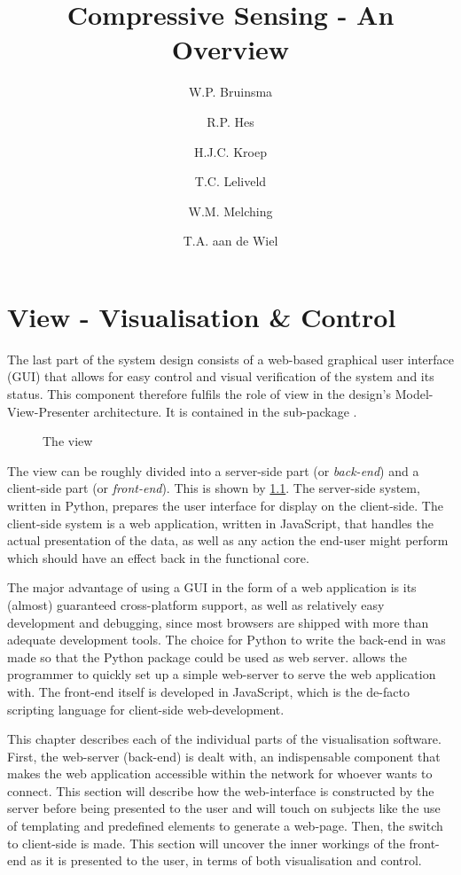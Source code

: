 \documentclass[a4paper, openany, oneside]{memoir}
\title{Compressive Sensing - An Overview}
\author{W.P. Bruinsma \and R.P. Hes \and H.J.C. Kroep \and T.C. Leliveld \and W.M. Melching \and T.A. aan de Wiel}
\begin{document}
\chapter{View - Visualisation \& Control}
\label{cha:view}
The last part of the system design consists of a web-based graphical user interface (GUI) that allows for easy control and visual verification of the system and its status. This component therefore fulfils the role of view in the design's Model-View-Presenter architecture. It is contained in the sub-package .

\begin{figure}[h]
    \centering
    \begin{adjustbox}{width=0.7\textwidth}
    
    \end{adjustbox}
    \caption{The view}
    \label{fig:view-diagram}
\end{figure}

The view can be roughly divided into a server-side part (or \emph{back-end}) and a client-side part (or \emph{front-end}). This is shown by \cref{fig:view-diagram}. The server-side system, written in Python, prepares the user interface for display on the client-side. The client-side system is a web application, written in JavaScript, that handles the actual presentation of the data, as well as any action the end-user might perform which should have an effect back in the functional core.

The major advantage of using a GUI in the form of a web application is its (almost) guaranteed cross-platform support, as well as relatively easy development and debugging, since most browsers are shipped with more than adequate development tools.
The choice for Python to write the back-end in was made so that the  Python package could be used as web server.  allows the programmer to quickly set up a simple web-server to serve the web application with.
The front-end itself is developed in JavaScript, which is the de-facto scripting language for client-side web-development.

This chapter describes each of the individual parts of the visualisation software.
First, the web-server (back-end) is dealt with, an indispensable component that makes the web application accessible within the network for whoever wants to connect. This section will describe how the web-interface is constructed by the server before being presented to the user and will touch on subjects like the use of templating and predefined elements to generate a web-page.
Then, the switch to client-side is made. This section will uncover the inner workings of the front-end as it is presented to the user, in terms of both visualisation and control.
\end{document}
